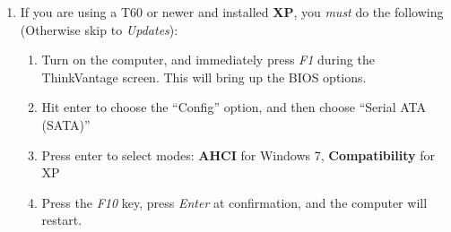 \documentclass[10pt]{article}
\begin{document}
\begin{enumerate}
\item If you are using a T60 or newer and installed {\bf XP}, you \emph{must} do the following (Otherwise skip to \emph{Updates}):
\begin{enumerate} %
\item Turn on the computer, and immediately press \emph{F1} during the ThinkVantage screen. This will bring up the BIOS options.
\item Hit enter to choose the ``Config'' option, and then choose ``Serial ATA (SATA)''
\item Press enter to select modes: {\bf AHCI} for Windows 7, {\bf Compatibility} for XP
\item Press the \emph{F10} key, press \emph{Enter} at confirmation, and the computer will restart.
\end{enumerate} %
\end{enumerate}


\end{document}
